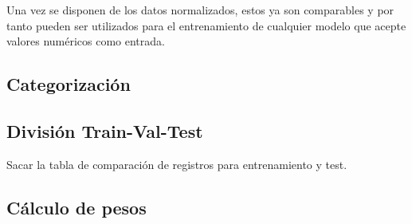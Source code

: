 \documentclass{uathesis-es}
\begin{document}
Una vez se disponen de los datos normalizados, estos ya son comparables y por tanto pueden ser utilizados para el entrenamiento de cualquier modelo que acepte valores numéricos como entrada.

\subsection{Categorización}


\subsection{División Train-Val-Test}

Sacar la tabla de comparación de registros para entrenamiento y test.

\subsection{Cálculo de pesos}

\end{document}
